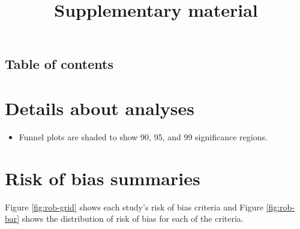 \documentclass{report}\usepackage[]{graphicx}\usepackage[]{color}
\title{Supplementary material}
\begin{document}
\maketitle

\section{Table of contents}

\tableofcontents

\listoftables

\listoffigures


\chapter{Details about analyses}

\begin{itemize}

\item Funnel plots are shaded to show 90, 95, and 99 significance regions.

\end{itemize}

\chapter{Risk of bias summaries}

Figure \ref{fig:rob-grid} shows each study's risk of bias criteria and Figure \ref{fig:rob-bar} shows the distribution of risk of bias for each of the criteria.
\end{document}
